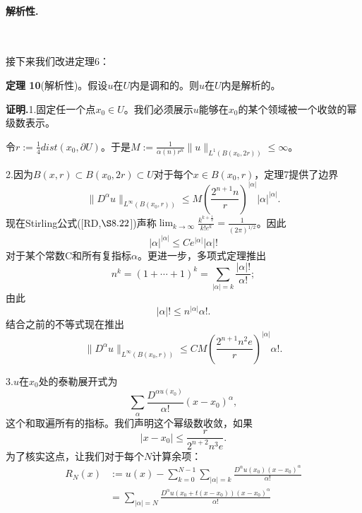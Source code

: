 \documentclass[leqno]{article}
\numberwithin{equation}{subsection}%
\begin{document}
\paragraph{解析性.}~{}
\par
接下来我们改进定理6：
\par
\noindent\textbf{定理 10}(解析性)。假设$u$在$U$内是调和的。则$u$在$U$内是解析的。
\par
\noindent\textbf{证明.}1.固定任一个点$x_{0}\in U$。我们必须展示$u$能够在$x_{0}$的某个领域被一个收敛的幂级数表示。
\par
令$r:=\frac{1}{4}dist(x_{0},\partial U)$。于是$M:=\frac{1}{\alpha(n)r^{n}}\|u\|_{L^{1}(B(x_{0},2r))}\le\infty$。
\par
2.因为$B(x,r)\subset B(x_{0},2r)\subset U$对于每个$x\in B(x_{0},r)$，定理7提供了边界
\begin{equation*}
\|D^{\alpha}u\|_{L^{\infty}\left(B\left(x_{0},r\right)\right)}\leq M\left(\frac{2^{n+1}n}{r}\right)^{|\alpha|}|\alpha|^{|\alpha|}.
\end{equation*}
现在Stirling公式([RD,$\S 8.22$])声称$\lim_{k\rightarrow\infty}\frac{k^{k+\frac{1}{2}}}{k!e^{k}}=\frac{1}{(2\pi)^{1/2}}$。因此
\begin{equation*}
	|\alpha|^{|\alpha|}\leq Ce^{|\alpha|}|\alpha|!
\end{equation*}
对于某个常数C和所有复指标$\alpha$。更进一步，多项式定理推出
\begin{equation*}
n^{k}=(1+\cdots+1)^{k}=\sum_{|\alpha|=k}\frac{|\alpha|!}{\alpha!};
\end{equation*}
由此
\begin{equation*}
|\alpha|!\leq n^{|\alpha|}\alpha !.
\end{equation*}
结合之前的不等式现在推出
\begin{equation}
\|D^{\alpha}u\|_{L^{\infty}(B(x_{0},r))}\leq CM\left(\frac{2^{n+1}n^{2}e}{r}\right)^{|\alpha|}\alpha!.
\end{equation}
\par
3.$u$在$x_{0}$处的泰勒展开式为
\begin{equation*}
\sum_{\alpha}\frac{D^{\alpha u(x_{0})}}{\alpha !}(x-x_{0})^{\alpha},
\end{equation*}
这个和取遍所有的指标。我们声明这个幂级数收敛，如果
\begin{equation}
|x-x_{0}|\le\frac{r}{2^{n+2}n^{3}e}.
\end{equation}
为了核实这点，让我们对于每个$N$计算余项：
\begin{equation*}
\begin{aligned}
R_{N}(x)&:=u(x)-\sum_{k=0}^{N-1}\sum_{|\alpha|=k}\frac{D^{\alpha}u(x_{0})(x-x_{0})^{\alpha}}{\alpha !}\\
&=\sum_{|\alpha|=N}\frac{D^{\alpha}u(x_{0}+t(x-x_{0}))(x-x_{0})^{\alpha}}{\alpha !}
\end{aligned}
\end{equation*}
\end{document}
